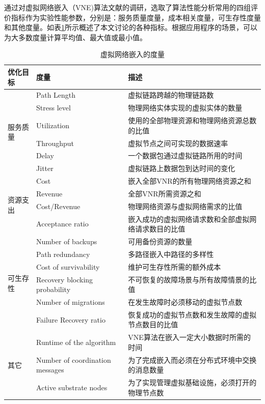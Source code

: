 通过对虚拟网络嵌入（VNE)算法文献的调研，选取了算法性能分析常用的四组评价指标作为实验性能参数，分别是：服务质量度量，成本相关度量，可生存性度量和其他度量。如表\ref{tab:MetricsForVirtualNetworkEmbedding}所示概述了本文讨论的各种指标。根据应用程序的场景，可以为大多数度量计算平均值、最大值或最小值。
\begin{table}[htb]
\caption{虚拟网络嵌入的度量}\label{tab:MetricsForVirtualNetworkEmbedding}
\vspace{0.5em}\centering\wuhao
\begin{tabular}{lll}
\toprule[1.5pt]
优化目标  & 度量   & 描述  \\
\midrule[1pt]
\multirow{6}{*}{服务质量} & Path Length  & 虚拟链路跨越的物理链路数\\
 & Stress level  & 物理网络实体实现的虚拟实体的数量\\
 & Utilization & 使用的全部物理资源和物理网络资源总数的比值\\
 & Throughput & 虚拟节点之间可实现的数据速率\\
 & Delay  & 一个数据包通过虚拟链路所用的时间
\\
 & Jitter  & 虚拟链路上数据包到达时间的变化\\
\hline
\multirow{4}{*}{资源支出} & Cost  & 嵌入全部VNR的所有物理网络资源之和\\
 & Revenue  & 全部VNR所需资源之和\\
 & Cost/Revenue & 物理网络资源与虚拟网络需求的比值\\
 & Acceptance ratio & 嵌入成功的虚拟网络请求数和全部虚拟网络请求数目的比值\\
\hline
\multirow{6}{*}{可生存性} & Number of backups  &可用备份资源的数量\\
 & Path redundancy  & 多路径嵌入中路径的多样性\\
 & Cost of survivability & 维护可生存性所需的额外成本\\
 & Recovery blocking probability & 不可恢复的故障场景与所有故障情景的比值\\
 & Number of migrations  & 在发生故障时必须移动的虚拟节点数\\
 & Failure Recovery ratio  & 恢复成功的虚拟节点数和发生故障的虚拟节点数目的比值\\
\hline
\multirow{3}{*}{其它} & Runtime of the algorithm  & VNE算法在嵌入一定大小数据时所需的时间\\
 & Number of coordination messages  & 为了完成嵌入而必须在分布式环境中交换的消息数量\\
 & Active substrate nodes & 为了实现管理虚拟基础设施，必须打开的物理节点数\\
\bottomrule[1.5pt]
\end{tabular}
\vspace{\baselineskip}
\end{table}


